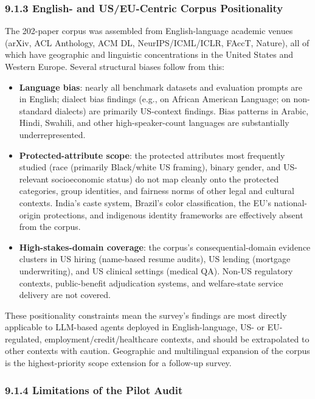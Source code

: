 \documentclass[10pt]{article}
\begin{document}
\subsubsection*{9.1.3 English- and US/EU-Centric Corpus Positionality}

The 202-paper corpus was assembled from English-language academic venues (arXiv, ACL Anthology, ACM DL, NeurIPS/ICML/ICLR, FAccT, Nature), all of which have geographic and linguistic concentrations in the United States and Western Europe. Several structural biases follow from this:

\begin{itemize}
\item \textbf{Language bias}: nearly all benchmark datasets and evaluation prompts are in English; dialect bias findings (e.g., \cite{mire2025rejected} on African American Language; \cite{lin2024assessing} on non-standard dialects) are primarily US-context findings. Bias patterns in Arabic, Hindi, Swahili, and other high-speaker-count languages are substantially underrepresented.
\item \textbf{Protected-attribute scope}: the protected attributes most frequently studied (race (primarily Black/white US framing), binary gender, and US-relevant socioeconomic status) do not map cleanly onto the protected categories, group identities, and fairness norms of other legal and cultural contexts. India's caste system, Brazil's color classification, the EU's national-origin protections, and indigenous identity frameworks are effectively absent from the corpus.
\item \textbf{High-stakes-domain coverage}: the corpus's consequential-domain evidence clusters in US hiring (name-based resume audits), US lending (mortgage underwriting), and US clinical settings (medical QA). Non-US regulatory contexts, public-benefit adjudication systems, and welfare-state service delivery are not covered.
\end{itemize}

These positionality constraints mean the survey's findings are most directly applicable to LLM-based agents deployed in English-language, US- or EU-regulated, employment/credit/healthcare contexts, and should be extrapolated to other contexts with caution. Geographic and multilingual expansion of the corpus is the highest-priority scope extension for a follow-up survey.

\subsubsection*{9.1.4 Limitations of the Pilot Audit}
\end{document}
